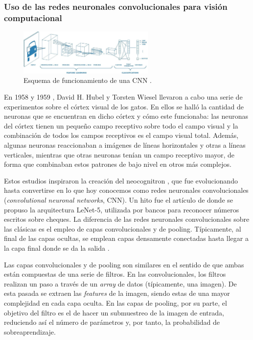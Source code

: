 \subsubsection*{Uso de las redes neuronales convolucionales para visión computacional}

\begin{figure}[H]
  \centering
  \includegraphics[width=0.6\textwidth]{images/cnn}
  \caption{Esquema de funcionamiento de una CNN \cite{mathWorksCnn}.}
  \label{fig:cnn}
\end{figure}

En 1958 \cite{art:cat58} y 1959 \cite{art:cat59}, David H. Hubel y Torsten Wiesel llevaron a cabo una serie de experimentos sobre el córtex visual de los gatos. En ellos se halló la cantidad de neuronas que se encuentran en dicho córtex y cómo este funcionaba: las neuronas del córtex tienen un pequeño campo receptivo sobre todo el campo visual y la combinación de todos los campos receptivos es el campo visual total. Además, algunas neuronas reaccionaban a imágenes de líneas horizontales y otras a líneas verticales, mientras que otras neuronas tenían un campo receptivo mayor, de forma que combinaban estos patrones de bajo nivel en otros más complejos.

Estos estudios inspiraron la creación del neocognitron \cite{art:neocognitron}, que fue evolucionando hasta convertirse en lo que hoy conocemos como redes neuronales convolucionales (\textit{convolutional neuronal networks}, CNN). Un hito fue el artículo de \citet{lecun1998gradient} donde se propuso la arquitectura LeNet-5, utilizada por bancos para reconocer números escritos sobre cheques. La diferencia de las redes neuronales convolucionales sobre las clásicas es el empleo de capas convolucionales y de pooling. Típicamente, al final de las capas ocultas, se emplean capas densamente conectadas hasta llegar a la capa final donde se da la salida \cite{book:homl}.

Las capas convolucionales y de pooling son similares en el sentido de que ambas están compuestas de una serie de filtros. En las convolucionales, los filtros realizan un paso a través de un \textit{array} de datos (típicamente, una imagen). De esta pasada se extraen las \textit{features} de la imagen, siendo estas de una mayor complejidad en cada capa oculta. En las capas de pooling, por su parte, el objetivo del filtro es el de hacer un submuestreo de la imagen de entrada, reduciendo así el número de parámetros y, por tanto, la probabilidad de sobreaprendizaje.

